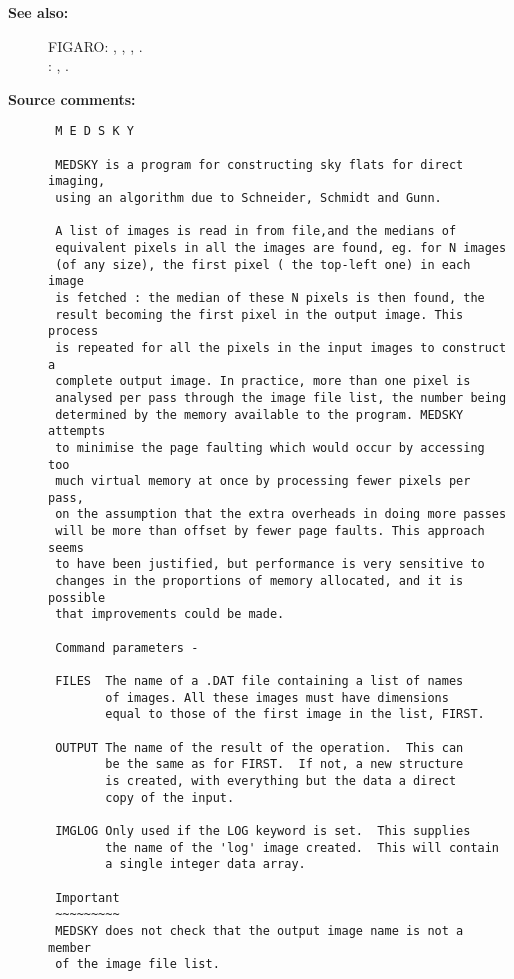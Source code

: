 \begin{description}
\item [{\bf See also:}]
FIGARO: , , , .\\
: , .\\

\item [{\bf Source comments:}]
\begin{verbatim}
 M E D S K Y

 MEDSKY is a program for constructing sky flats for direct imaging,
 using an algorithm due to Schneider, Schmidt and Gunn.

 A list of images is read in from file,and the medians of
 equivalent pixels in all the images are found, eg. for N images
 (of any size), the first pixel ( the top-left one) in each image
 is fetched : the median of these N pixels is then found, the
 result becoming the first pixel in the output image. This process
 is repeated for all the pixels in the input images to construct a
 complete output image. In practice, more than one pixel is
 analysed per pass through the image file list, the number being
 determined by the memory available to the program. MEDSKY attempts
 to minimise the page faulting which would occur by accessing too
 much virtual memory at once by processing fewer pixels per pass,
 on the assumption that the extra overheads in doing more passes
 will be more than offset by fewer page faults. This approach seems
 to have been justified, but performance is very sensitive to
 changes in the proportions of memory allocated, and it is possible
 that improvements could be made.

 Command parameters -

 FILES  The name of a .DAT file containing a list of names
        of images. All these images must have dimensions
        equal to those of the first image in the list, FIRST.

 OUTPUT The name of the result of the operation.  This can
        be the same as for FIRST.  If not, a new structure
        is created, with everything but the data a direct
        copy of the input.

 IMGLOG Only used if the LOG keyword is set.  This supplies
        the name of the 'log' image created.  This will contain
        a single integer data array.

 Important
 ~~~~~~~~~
 MEDSKY does not check that the output image name is not a member
 of the image file list.


\end{verbatim}
\end{description}
